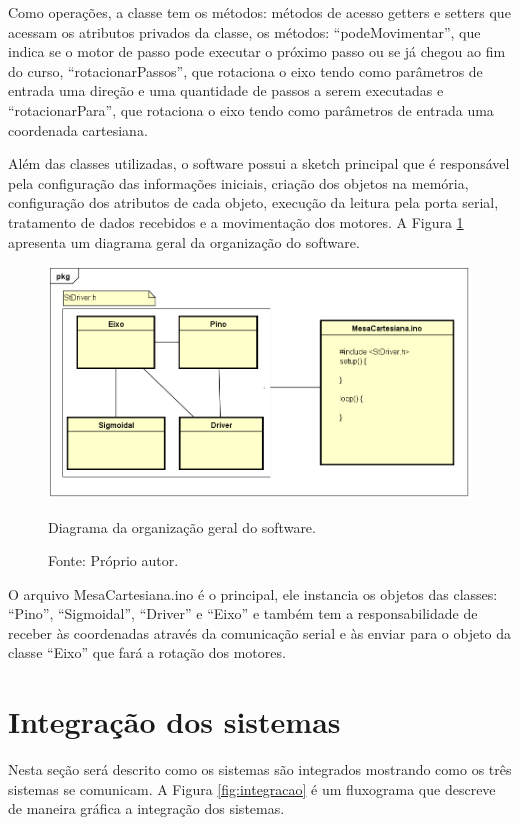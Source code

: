 Como operações, a classe tem os métodos: métodos de acesso getters e setters que acessam os atributos 
privados da classe, os métodos: “podeMovimentar”, que indica se o motor de passo pode executar o próximo 
passo ou se já chegou ao fim do curso, “rotacionarPassos”, que rotaciona o eixo tendo como parâmetros de 
entrada uma direção e uma quantidade de passos a serem executadas e “rotacionarPara”, que rotaciona o 
eixo tendo como parâmetros de entrada uma coordenada cartesiana.

Além das classes utilizadas, o software possui a sketch principal que é responsável pela configuração das 
informações iniciais, criação dos objetos na memória, configuração dos atributos de cada objeto, execução 
da leitura pela porta serial, tratamento de dados recebidos e a movimentação dos motores.
A Figura \ref{fig:orgsoftware} apresenta um diagrama geral da organização do software.

\begin{figure}[!htb]
\centering
\includegraphics[scale = 0.65]{figuras/orgsoftware}
\caption{Diagrama da organização geral do software.}
\caption*{Fonte: Próprio autor.}
\label{fig:orgsoftware}
\end{figure}
    
O arquivo MesaCartesiana.ino é o principal, ele instancia os objetos das classes: “Pino”, “Sigmoidal”, 
“Driver” e “Eixo” e também tem a responsabilidade de receber às coordenadas através da comunicação serial 
e às enviar para o objeto da classe “Eixo” que fará a rotação dos motores.

\section{Integração dos sistemas}\label{subsec:metintegracao}

Nesta seção será descrito como os sistemas são integrados mostrando como os três sistemas se comunicam. 
A Figura \ref{fig:integracao} é um fluxograma que descreve de maneira gráfica a integração dos sistemas.

